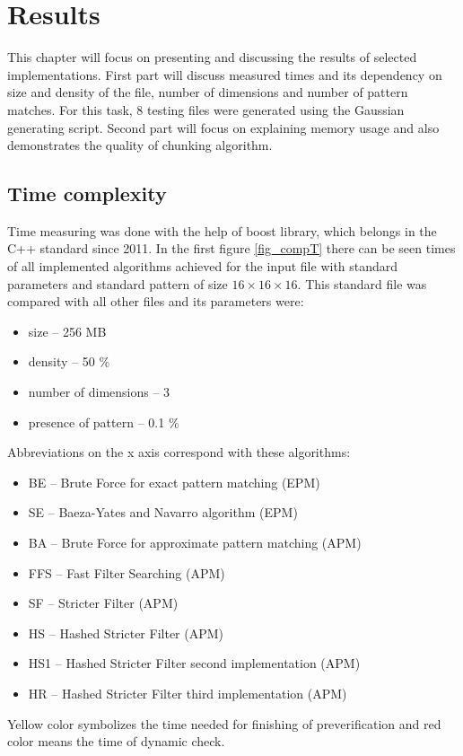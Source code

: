 \chapter{Results}
This chapter will focus on presenting and discussing the results of selected implementations. First part will discuss measured times and its dependency on size and density of the file, number of dimensions and number of pattern matches. For this task, 8 testing files were generated using the Gaussian generating script. Second part will focus on explaining memory usage and also demonstrates the quality of chunking algorithm.

\section{Time complexity}
Time measuring was done with the help of boost library, which belongs in the C++ standard since 2011. In the first figure \ref{fig_compT} there can be seen times of all implemented algorithms achieved for the input file with standard parameters and standard pattern of size $16\times16\times16$. This standard file was compared with all other files and its parameters were:
\begin{itemize}
\item size -- 256 MB
\item density -- 50 \%
\item number of dimensions -- 3
\item presence of pattern -- 0.1 \%
\end{itemize}

Abbreviations on the x axis correspond with these algorithms:
\begin{itemize}
\item BE -- Brute Force for exact pattern matching (EPM)
\item SE -- Baeza-Yates and Navarro algorithm (EPM)
\item BA -- Brute Force for approximate pattern matching (APM)
\item FFS -- Fast Filter Searching (APM)
\item SF -- Stricter Filter (APM)
\item HS -- Hashed Stricter Filter (APM)
\item HS1 -- Hashed Stricter Filter second implementation (APM)
\item HR -- Hashed Stricter Filter third implementation (APM)
\end{itemize}

Yellow color symbolizes the time needed for finishing of preverification and red color means the time of dynamic check.

